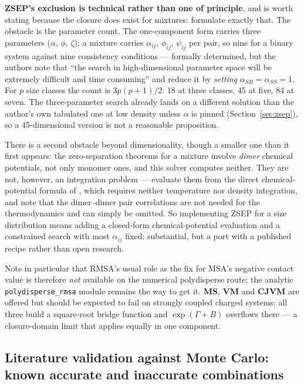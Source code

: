 \documentclass[11pt,a4paper]{article}
\newcommand{\code}[1]{\texttt{#1}}
\begin{document}
\begin{itemize}[nosep]
    \textbf{ZSEP's exclusion is technical rather than one of principle}, and
    is worth stating because the closure does exist for mixtures:
    \citet{LeeMalijevsky2001} formulate exactly that. The obstacle is the
    parameter count. The one-component form carries three parameters
    ($\alpha$, $\phi$, $\zeta$); a mixture carries $\alpha_{ij}$,
    $\phi_{ij}$, $\psi_{ij}$ per pair, so nine for a binary system against
    nine consistency conditions --- formally determined, but the authors note
    that ``the search in high-dimensional parameter space will be extremely
    difficult and time consuming'' and reduce it by \emph{setting}
    $\alpha_{SB} = \alpha_{SS} = 1$. For $p$ size classes the count is
    $3p(p+1)/2$: 18 at three classes, 45 at five, 84 at seven. The
    three-parameter search already lands on a different solution than the
    author's own tabulated one at low density unless $\alpha$ is pinned
    (Section~\ref{sec:zsep}), so a 45-dimensional version is not a
    reasonable proposition.

    There is a second obstacle beyond dimensionality, though a smaller one
    than it first appears: the zero-separation theorems for a mixture
    involve \emph{dimer} chemical potentials, not only monomer ones, and
    this solver computes neither. They are not, however, an integration
    problem --- \citet{WilsonLee2005} evaluate them from the direct
    chemical-potential formula of \citet{Lee1992}, which requires neither
    temperature nor density integration, and note that the dimer--dimer pair
    correlations are not needed for the thermodynamics and can simply be
    omitted. So implementing ZSEP for a size distribution means adding a
    closed-form chemical-potential evaluation and a constrained search with
    most $\alpha_{ij}$ fixed: substantial, but a port with a published
    recipe rather than open research.

    Note in particular that RMSA's usual role as the fix
    for MSA's negative contact value is therefore \emph{not} available on the
    numerical polydisperse route; the analytic \code{polydisperse\_rmsa}
    module remains the way to get it. \textbf{MS}, \textbf{VM} and
    \textbf{CJVM} are offered but should be expected to fail on strongly
    coupled charged systems: all three build a square-root bridge function
    and $\exp(\Gamma+B)$ overflows there --- a closure-domain limit that
    applies equally in one component.
\end{itemize}

\subsection{Literature validation against Monte Carlo: known accurate and inaccurate combinations}
\label{sec:mc-literature}
\end{document}
